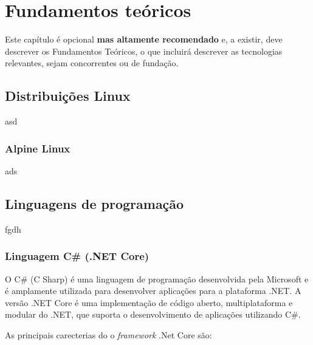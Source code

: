 \chapter{Fundamentos teóricos}
\label{chap:theo}

Este capítulo é opcional \textbf{mas altamente recomendado} e, a existir, deve descrever os Fundamentos Teóricos, o que incluirá descrever as tecnologias relevantes, sejam concorrentes ou de fundação.


\section{Distribuições Linux}

asd

\subsection{Alpine Linux}

ads

\section{Linguagens de programação}

fgdh

\subsection{Linguagem C\# (.NET Core)}

O C\# (C Sharp) é uma linguagem de programação desenvolvida pela Microsoft e é amplamente
utilizada para desenvolver aplicações para a plataforma .NET. A versão .NET Core 
é uma implementação de código aberto, multiplataforma e modular do .NET,
que suporta o desenvolvimento de aplicações utilizando C\#.

As principais carecterias do o \textit{framework} .Net Core são:

